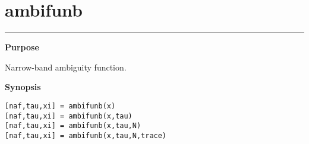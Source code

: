 

\section*{\hspace*{-1.6cm} ambifunb}

\vspace*{-.4cm}
\hspace*{-1.6cm}\rule[0in]{16.5cm}{.02cm}
\vspace*{.2cm}


{\bf \large \sf Purpose}\\
\hspace*{1.5cm}
\begin{minipage}[t]{13.5cm}
Narrow-band ambiguity function.
\end{minipage}
\vspace*{.5cm}


{\bf \large \sf Synopsis}\\
\hspace*{1.5cm}
\begin{minipage}[t]{13.5cm}
\begin{verbatim}
[naf,tau,xi] = ambifunb(x)
[naf,tau,xi] = ambifunb(x,tau)
[naf,tau,xi] = ambifunb(x,tau,N)
[naf,tau,xi] = ambifunb(x,tau,N,trace)
\end{verbatim}
\end{minipage}
\vspace*{.5cm}


